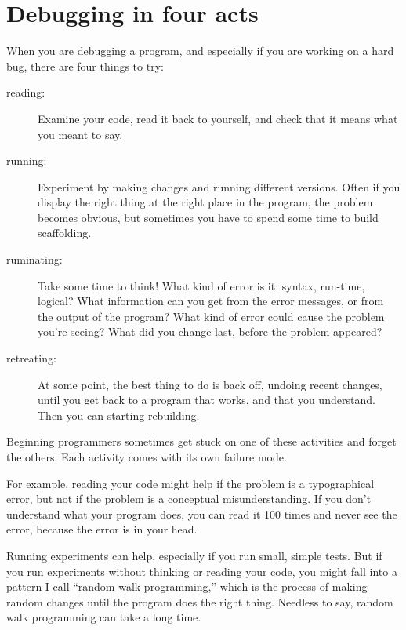 \documentclass[
]{book}
\begin{document}
\section{Debugging in four acts}

When you are debugging a program, and especially if you are
working on a hard bug, there are four things to try:

\begin{description}

\item[reading:] Examine your code, read it back to yourself, and
check that it means what you meant to say.

\item[running:] Experiment by making changes and running different
versions.  Often if you display the right thing at the right place
in the program, the problem becomes obvious, but sometimes you have to
spend some time to build scaffolding.

\item[ruminating:] Take some time to think!  What kind of error
is it: syntax, run-time, logical?  What information can you get from
the error messages, or from the output of the program?  What kind of
error could cause the problem you're seeing?  What did you change
last, before the problem appeared?

\item[retreating:] At some point, the best thing to do is back
off, undoing recent changes, until you get back to a program that
works, and that you understand.  Then you can starting rebuilding.

\end{description}

Beginning programmers sometimes get stuck on one of these activities
and forget the others.  Each activity comes with its own failure
mode.

For example, reading your code might help if the problem is a
typographical error, but not if the problem is a conceptual
misunderstanding.  If you don't understand what your program does, you
can read it 100 times and never see the error, because the error is in
your head.

Running experiments can help, especially if you run small, simple
tests.  But if you run experiments without thinking or reading your
code, you might fall into a pattern I call ``random walk programming,''
which is the process of making random changes until the program
does the right thing.  Needless to say, random walk programming
can take a long time.
\end{document}
